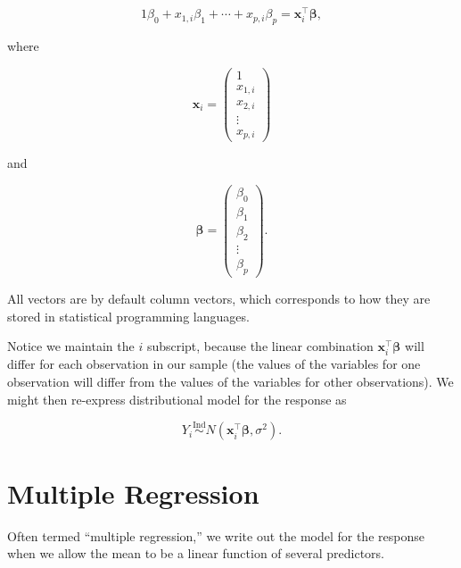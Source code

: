\documentclass[
  letterpaper,
  DIV=11,
  numbers=noendperiod]{scrreprt}
\theoremstyle{definition}
\theoremstyle{plain}
\theoremstyle{definition}
\theoremstyle{remark}
\begin{document}
\[1 \beta_0 + x_{1,i} \beta_1 + \dotsb + x_{p,i} \beta_p = \mathbf{x}_i^\top \boldsymbol{\beta},\]

where

\[\mathbf{x}_i = \begin{pmatrix} 1 \\x_{1,i} \\ x_{2,i} \\ \vdots \\ x_{p,i} \end{pmatrix}\]

and

\[\boldsymbol{\beta} = \begin{pmatrix} \beta_0 \\ \beta_1 \\ \beta_2 \\ \vdots \\ \beta_p \end{pmatrix}.\]

\begin{tcolorbox}[enhanced jigsaw, breakable, colframe=quarto-callout-note-color-frame, titlerule=0mm, arc=.35mm, coltitle=black, opacitybacktitle=0.6, leftrule=.75mm, opacityback=0, left=2mm, toprule=.15mm, colbacktitle=quarto-callout-note-color!10!white, title=\textcolor{quarto-callout-note-color}{\faInfo}\hspace{0.5em}{Note}, bottomtitle=1mm, toptitle=1mm, rightrule=.15mm, bottomrule=.15mm, colback=white]

All vectors are by default column vectors, which corresponds to how they
are stored in statistical programming languages.

\end{tcolorbox}

Notice we maintain the \(i\) subscript, because the linear combination
\(\mathbf{x}_i^\top \boldsymbol{\beta}\) will differ for each
observation in our sample (the values of the variables for one
observation will differ from the values of the variables for other
observations). We might then re-express distributional model for the
response as

\[Y_i \stackrel{\text{Ind}}{\sim} N\left(\mathbf{x}_i^\top \boldsymbol{\beta}, \sigma^2\right).\]

\section{Multiple Regression}\label{multiple-regression}

Often termed ``multiple regression,'' we write out the model for the
response when we allow the mean to be a linear function of several
predictors.
\end{document}
